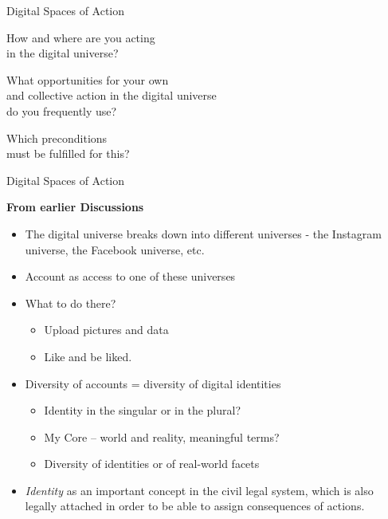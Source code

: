 \documentclass{beamer}
\newcommand{\ueberschrift}[1]{\begin{center}\bf #1\end{center}}
\begin{document}
\begin{frame}{Digital Spaces of Action}\centering\Large\bf

  How and where are you acting\\ in the digital universe?

  What opportunities for your own\\ and collective action in the digital
  universe\\ do you frequently use?

  Which preconditions\\ must be fulfilled for this?
\end{frame}
\begin{frame}{Digital Spaces of Action}
  \ueberschrift{From earlier Discussions}
  \begin{itemize}
  \item The digital universe breaks down into different universes - the
    Instagram universe, the Facebook universe, etc.
  \item Account as access to one of these universes
  \item What to do there?
    \begin{itemize}
    \item Upload pictures and data
    \item Like and be liked.
    \end{itemize}
  \item Diversity of accounts = diversity of digital identities
    \begin{itemize}
    \item Identity in the singular or in the plural?
    \item My Core -- world and reality, meaningful terms?
    \item Diversity of identities or of real-world facets
    \end{itemize}
  \item \emph{Identity} as an important concept in the civil legal system,
    which is also legally attached in order to be able to assign consequences
    of actions.
  \end{itemize}
\end{frame}
\end{document}
